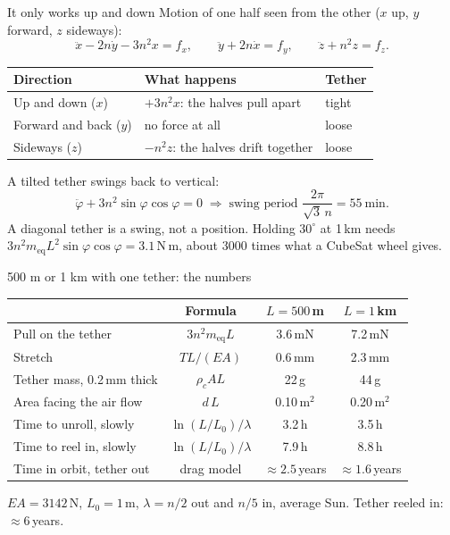 \documentclass[aspectratio=169,11pt]{beamer}
\newcommand{\meq}{m_{\mathrm{eq}}}
\begin{document}
\begin{frame}{It only works up and down}
\small
Motion of one half seen from the other ($x$ up, $y$ forward, $z$ sideways):
\begin{equation*}
\ddot{x} - 2n\dot{y} - 3n^{2}x = f_x,\qquad
\ddot{y} + 2n\dot{x} = f_y,\qquad
\ddot{z} + n^{2}z = f_z .
\end{equation*}
\vspace{-0.2cm}
\begin{center}
\renewcommand{\arraystretch}{1.3}
\begin{tabular}{@{}lll@{}}
\toprule
Direction & What happens & Tether \\
\midrule
Up and down ($x$) & $+3n^{2}x$: the halves pull apart & tight \\
Forward and back ($y$) & no force at all & loose \\
Sideways ($z$) & $-n^{2}z$: the halves drift together & loose \\
\bottomrule
\end{tabular}
\end{center}
A tilted tether swings back to vertical:
\begin{equation*}
\ddot{\varphi} + 3n^{2}\sin\varphi\cos\varphi = 0
\;\Rightarrow\;
\text{swing period } \frac{2\pi}{\sqrt{3}\,n} = 55\ \mathrm{min}.
\end{equation*}
\alert{A diagonal tether is a swing, not a position.} Holding $30^\circ$ at 1\,km needs
$3n^{2}\meq L^{2}\sin\varphi\cos\varphi = 3.1$\,N\,m, about 3000 times what a CubeSat wheel gives.
\end{frame}
\begin{frame}{500 m or 1 km with one tether: the numbers}
\centering
\renewcommand{\arraystretch}{1.25}
\begin{tabular}{@{}lccc@{}}
\toprule
 & Formula & $L = 500$\,m & $L = 1$\,km \\
\midrule
Pull on the tether & $3n^{2}\meq L$ & 3.6\,mN & 7.2\,mN \\
Stretch & $TL/(EA)$ & 0.6\,mm & 2.3\,mm \\
Tether mass, 0.2\,mm thick & $\rho_c A L$ & 22\,g & 44\,g \\
Area facing the air flow & $d\,L$ & 0.10\,m$^{2}$ & 0.20\,m$^{2}$ \\
Time to unroll, slowly & $\ln(L/L_0)/\lambda$ & 3.2\,h & 3.5\,h \\
Time to reel in, slowly & $\ln(L/L_0)/\lambda$ & 7.9\,h & 8.8\,h \\
Time in orbit, tether out & drag model & $\approx 2.5$\,years & $\approx 1.6$\,years \\
\bottomrule
\end{tabular}

\vspace{0.25cm}
{\footnotesize\color{black!65} $EA = 3142$\,N, $L_0 = 1$\,m, $\lambda = n/2$ out and $n/5$ in, average Sun. Tether reeled in: $\approx 6$\,years.}
\end{frame}
\end{document}
